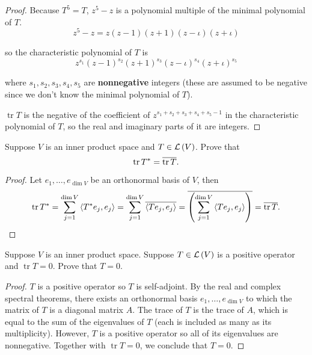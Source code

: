 \begin{proof}
    Because $T^{5} = T$, $z^{5} - z$ is a polynomial multiple of the minimal polynomial of $T$.
    \[
        z^{5} - z = z(z - 1)(z + 1)(z - \iota)(z + \iota)
    \]

    so the characteristic polynomial of $T$ is
    \[
        z^{s_{1}}{(z - 1)}^{s_{2}}{(z + 1)}^{s_{3}}{(z - \iota)}^{s_{4}}{(z + \iota)}^{s_{5}}
    \]

    where $s_{1}, s_{2}, s_{3}, s_{4}, s_{5}$ are \textbf{nonnegative} integers (these are assumed to be negative since we don't know the minimal polynomial of $T$).

    $\operatorname{tr}T$ is the negative of the coefficient of $z^{s_{1} + s_{2} + s_{3} + s_{4} + s_{5} - 1}$ in the characteristic polynomial of $T$, so the real and imaginary parts of it are integers.
\end{proof}
\newpage

\begin{exercise}\label{chapter8:sectionD:exercise4}
    Suppose $V$ is an inner product space and $T\in\mathcal{L}\left({V}\right)$. Prove that
    \[
        \operatorname{tr}T^{*} = \overline{\operatorname{tr} T}.
    \]
\end{exercise}

\begin{proof}
    Let $e_{1}, \ldots, e_{\dim V}$ be an orthonormal basis of $V$, then
    \[
        \operatorname{tr}T^{*} = \sum^{\dim V}_{j=1}\left\langle{T^{*}e_{j},e_{j}}\right\rangle = \sum^{\dim V}_{j=1}\overline{\left\langle{Te_{j}, e_{j}}\right\rangle} = \overline{\left(\sum^{\dim V}_{j=1}\left\langle{Te_{j}, e_{j}}\right\rangle\right)} = \overline{\operatorname{tr}T}.\qedhere
    \]
\end{proof}
\newpage

\begin{exercise}\label{chapter8:sectionD:exercise5}
    Suppose $V$ is an inner product space. Suppose $T\in\mathcal{L}\left({V}\right)$ is a positive operator and $\operatorname{tr} T = 0$. Prove that $T = 0$.
\end{exercise}

\begin{proof}
    $T$ is a positive operator so $T$ is self-adjoint. By the real and complex spectral theorems, there exists an orthonormal basis $e_{1}, \ldots, e_{\dim V}$ to which the matrix of $T$ is a diagonal matrix $A$. The trace of $T$ is the trace of $A$, which is equal to the sum of the eigenvalues of $T$ (each is included as many as its multiplicity). However, $T$ is a positive operator so all of its eigenvalues are nonnegative. Together with $\operatorname{tr}T = 0$, we conclude that $T = 0$.
\end{proof}
\newpage

